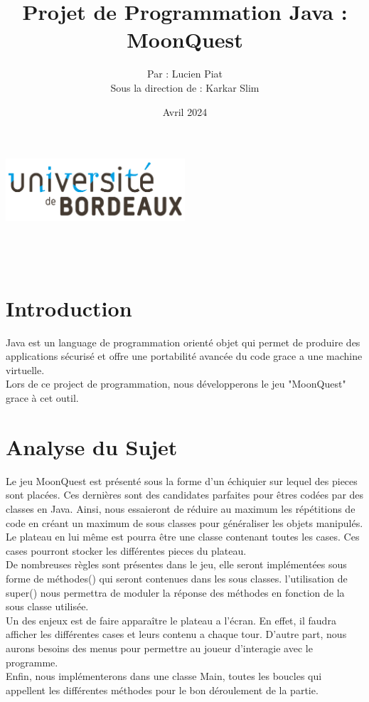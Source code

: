 \documentclass[titlepage]{report}
\title{Projet de Programmation Java : MoonQuest}
\author{Par : Lucien Piat \\ \vspace{.5cm} Sous la direction de : Karkar Slim}
\date{Avril 2024}
\makeatletter
\def\maketitle{
\raggedright
\begin{center}
\includegraphics[width = 0.5\textwidth]{img/logo_ub.png}\\[15ex]
{\Huge \bfseries \@title }\\[10ex] 
{\huge  \@author}\\[10ex] 
{\Large \@date}\\
\end{center}}
\makeatother
\begin{document}
\maketitle
\thispagestyle{empty} 
\newpage
\tableofcontents
\thispagestyle{empty} 

\newpage
{}
\justify 
\section{Introduction}

Java est un language de programmation orienté objet qui permet de produire des applications sécurisé et 
offre une portabilité avancée du code grace a une machine virtuelle.\\

Lors de ce project de programmation, nous développerons le jeu "MoonQuest" grace à cet outil.  

\section{Analyse du Sujet}

Le jeu MoonQuest est présenté sous la forme d'un échiquier sur lequel des pieces sont placées.
Ces dernières sont des candidates parfaites pour êtres codées par des classes en Java.
Ainsi, nous essaieront de réduire au maximum les répétitions de code en créant un maximum de sous classes pour généraliser les objets manipulés.\\

Le plateau en lui même est pourra être une classe contenant toutes les cases. Ces cases pourront stocker les différentes pieces du plateau.\\

De nombreuses règles sont présentes dans le jeu, elle seront implémentées sous forme de méthodes() qui seront contenues dans les sous classes.
l’utilisation de super() nous permettra de moduler la réponse des méthodes en fonction de la sous classe utilisée.\\

Un des enjeux est de faire apparaître le plateau a l'écran. En effet, il faudra afficher les différentes cases et leurs contenu a chaque tour.
D'autre part, nous aurons besoins des menus pour permettre au joueur d’interagie avec le programme.\\

Enfin, nous implémenterons dans une classe Main, toutes les boucles qui appellent les différentes méthodes pour le bon déroulement de la partie.\\
\end{document}
